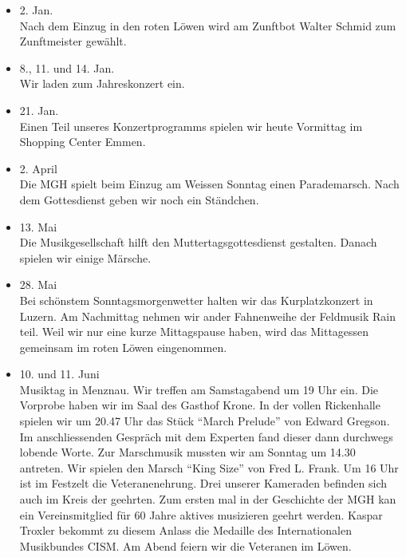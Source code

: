 \begin{history}


    \begin{itemize}

        \item[]2. Jan.\\
        Nach dem Einzug in den roten Löwen wird am Zunftbot Walter Schmid zum
        Zunftmeister gewählt.

        \item[]8., 11. und 14. Jan.\\
        Wir laden zum Jahreskonzert ein.

        \item[]21. Jan.\\
        Einen Teil unseres Konzertprogramms spielen wir heute Vormittag im
        Shopping Center Emmen.

        \item[]2. April\\
        Die MGH spielt beim Einzug am Weissen Sonntag einen Parademarsch. Nach
        dem Gottesdienst geben wir noch ein Ständchen.

        \item[]13. Mai\\
        Die Musikgesellschaft hilft den Muttertagsgottesdienst gestalten. Danach
        spielen wir einige Märsche.

        \item[]28. Mai\\
        Bei schönstem Sonntagsmorgenwetter halten wir das Kurplatzkonzert in
        Luzern. Am Nachmittag nehmen wir ander Fahnenweihe der Feldmusik Rain
        teil. Weil wir nur eine kurze Mittagspause haben, wird das Mittagessen
        gemeinsam im roten Löwen eingenommen.

        \item[]10. und 11. Juni\\
        Musiktag in Menznau. Wir treffen am Samstagabend um 19 Uhr ein. Die
        Vorprobe haben wir im Saal des Gasthof Krone. In der vollen Rickenhalle
        spielen wir um 20.47 Uhr das Stück \enquote{March Prelude} von Edward
        Gregson. Im anschliessenden Gespräch mit dem Experten fand dieser dann
        durchwegs lobende Worte. Zur Marschmusik mussten wir am Sonntag um 14.30
        antreten. Wir spielen den Marsch \enquote{King Size} von Fred L. Frank.
        Um 16 Uhr ist im Festzelt die Veteranenehrung. Drei unserer Kameraden
        befinden sich auch im Kreis der geehrten. Zum ersten mal in der
        Geschichte der MGH kan ein Vereinsmitglied für 60 Jahre aktives
        musizieren geehrt werden. Kaspar Troxler bekommt zu diesem Anlass die
        Medaille des Internationalen Musikbundes CISM. Am Abend feiern wir die
        Veteranen im Löwen.


\end{itemize}
\end{history}
